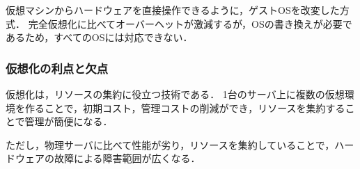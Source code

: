\begin{description}
    \setlength{\leftskip}{1em}
    \item[準仮想化] 仮想マシンからハードウェアを直接操作できるように，ゲストOSを改変した方式．
        完全仮想化に比べてオーバーヘットが激減するが，OSの書き換えが必要であるため，すべてのOSには対応できない．
\end{description}
\subsubsection*{仮想化の利点と欠点}
仮想化は，リソースの集約に役立つ技術である．
1台のサーバ上に複数の仮想環境を作ることで，初期コスト，管理コストの削減ができ，リソースを集約することで管理が簡便になる．\par
ただし，物理{{サーバ}}に比べて性能が劣り，リソースを集約していることで，ハードウェアの故障による障害範囲が広くなる．
